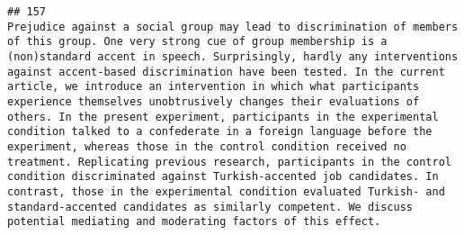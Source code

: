 \documentclass[
  english,
  man]{apa6}
\begin{document}
\begin{verbatim}
## 157                                                                                                                                                                                                                                                                                                                                                                                                                                                                                                                                                                                                                                                                                                                                                                                                                                                                                                                                                                                                                                                                                                                                                                                                                                                                                                                                                                                                                                                                                                                                                                                                                                                                                                         Prejudice against a social group may lead to discrimination of members of this group. One very strong cue of group membership is a (non)standard accent in speech. Surprisingly, hardly any interventions against accent-based discrimination have been tested. In the current article, we introduce an intervention in which what participants experience themselves unobtrusively changes their evaluations of others. In the present experiment, participants in the experimental condition talked to a confederate in a foreign language before the experiment, whereas those in the control condition received no treatment. Replicating previous research, participants in the control condition discriminated against Turkish-accented job candidates. In contrast, those in the experimental condition evaluated Turkish- and standard-accented candidates as similarly competent. We discuss potential mediating and moderating factors of this effect.

\end{verbatim}
\end{document}
